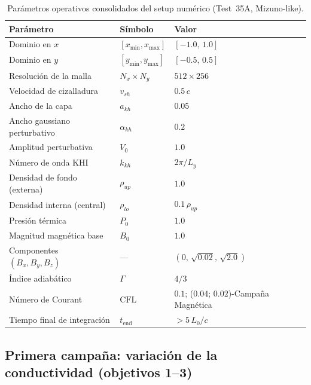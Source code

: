 \begin{table}[H]
\centering
\caption{Parámetros operativos consolidados del setup numérico (Test~35A, Mizuno-like).}
\label{tab:setup_summary}
\setlength{\tabcolsep}{4pt}
\begin{tabular}{@{}ll p{4.2cm}@{}}
\hline
\textbf{Parámetro} & \textbf{Símbolo} & \textbf{Valor} \\
\hline
Dominio en $x$              & $[x_{\min}, x_{\max}]$ & $[-1.0,\, 1.0]$ \\
Dominio en $y$              & $[y_{\min}, y_{\max}]$ & $[-0.5,\, 0.5]$ \\
Resolución de la malla      & $N_x \times N_y$        & $512 \times 256$ \\
Velocidad de cizalladura    & $v_{sh}$                & $0.5\, c$ \\
Ancho de la capa            & $a_{kh}$                & $0.05$ \\
Ancho gaussiano perturbativo& $\alpha_{kh}$           & $0.2$ \\
Amplitud perturbativa       & $V_0$                   & $1.0$ \\
Número de onda KHI          & $k_{kh}$                & $2\pi/L_y$ \\
Densidad de fondo (externa) & $\rho_{up}$             & $1.0$ \\
Densidad interna (central)  & $\rho_{lo}$             & $0.1\,\rho_{up}$ \\
Presión térmica             & $P_0$                   & $1.0$ \\
Magnitud magnética base     & $B_0$                   & $1.0$ \\
Componentes $(B_x,B_y,B_z)$ & ---                     & $(0,\, \sqrt{0.02},\, \sqrt{2.0})$ \\
Índice adiabático           & $\Gamma$                & $4/3$ \\
Número de Courant           & $\text{CFL}$            & $0.1$; ($0.04$; $0.02$)-Campaña Magnética\\
Tiempo final de integración & $t_{\text{end}}$        & $>5\,L_0/c$ \\
\hline
\end{tabular}
\end{table}

\subsection{Primera campaña: variación de la conductividad (objetivos 1--3)}
\label{subsec:barrido_sigma}

